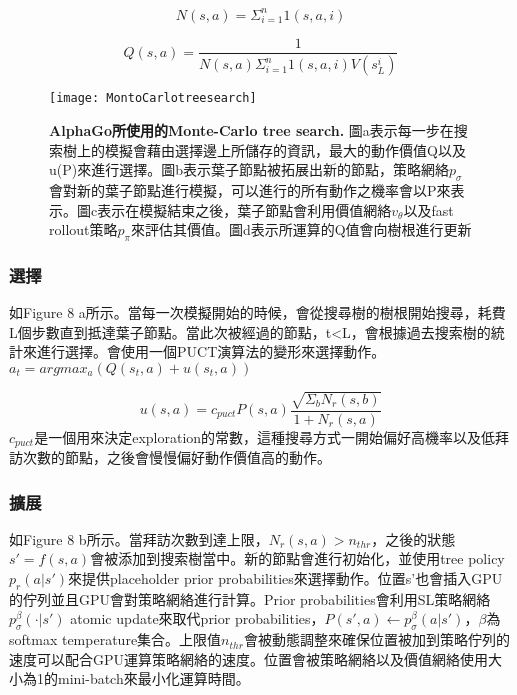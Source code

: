 \documentclass[a4paper,12pt]{article}
\begin{document}
\begin{equation}
N(s,a)=\Sigma^{n}_{i=1}1(s,a,i)
\end{equation}

\begin{equation}
Q(s,a)=\frac{1}{N(s,a)\Sigma^{n}_{i=1}1(s,a,i)V(s^{i}_{L})}
\end{equation}
 
\begin{figure*}[htb]
\texttt{[image: MontoCarlotreesearch]}
\caption{\textbf{AlphaGo所使用的Monte-Carlo tree search.} 圖a表示每一步在搜索樹上的模擬會藉由選擇邊上所儲存的資訊，最大的動作價值Q以及u(P)來進行選擇。圖b表示葉子節點被拓展出新的節點，策略網絡$p_{\sigma}$會對新的葉子節點進行模擬，可以進行的所有動作之機率會以P來表示。圖c表示在模擬結束之後，葉子節點會利用價值網絡$v_{\theta}$以及fast rollout策略$p_{\pi}$來評估其價值。圖d表示所運算的Q值會向樹根進行更新}
\end{figure*}

\subsubsection{選擇}
\qquad 如Figure 8 a所示。當每一次模擬開始的時候，會從搜尋樹的樹根開始搜尋，耗費L個步數直到抵達葉子節點。當此次被經過的節點，t<L，會根據過去搜索樹的統計來進行選擇。會使用一個PUCT演算法的變形來選擇動作。$a_{t}=argmax_{a}(Q(s_{t},a)+u(s_{t},a))$

\begin{equation}
u(s,a)=c_{puct}P(s,a)\frac{\sqrt{\Sigma_{b}N_{r}(s,b)}}{1+N_{r}(s,a)}
\end{equation}
\qquad $c_{puct}$是一個用來決定exploration的常數，這種搜尋方式一開始偏好高機率以及低拜訪次數的節點，之後會慢慢偏好動作價值高的動作。

\subsubsection{擴展}
\qquad 如Figure 8 b所示。當拜訪次數到達上限，$N_{r}(s,a)>n_{thr}$，之後的狀態$s'=f(s,a)$會被添加到搜索樹當中。新的節點會進行初始化，並使用tree policy $p_{r}(a|s')$來提供placeholder prior probabilities來選擇動作。位置s'也會插入GPU的佇列並且GPU會對策略網絡進行計算。Prior probabilities會利用SL策略網絡$p^{\beta}_{\sigma}(\cdot |s')$ atomic update來取代prior probabilities，$P(s',a)\leftarrow p^{\beta}_{\sigma}(a|s')$，$\beta$為softmax temperature集合。上限值$n_{thr}$會被動態調整來確保位置被加到策略佇列的速度可以配合GPU運算策略網絡的速度。位置會被策略網絡以及價值網絡使用大小為1的mini-batch來最小化運算時間。
\end{document}
